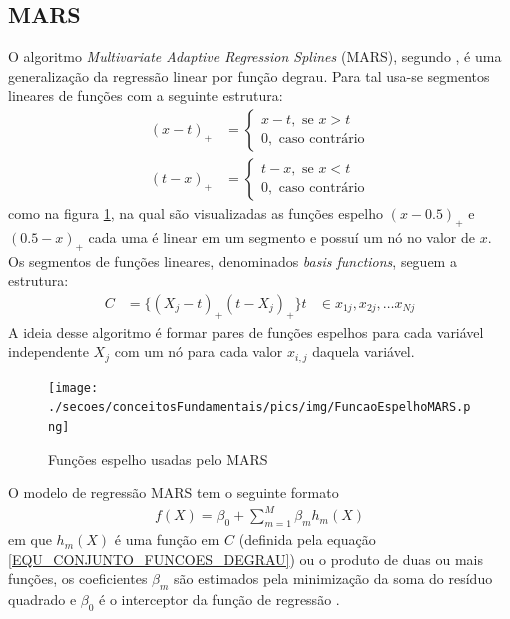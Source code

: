 \subsection{MARS}
O algoritmo \emph{Multivariate Adaptive Regression Splines} (MARS), segundo , é uma generalização da regressão linear por função degrau. Para tal usa-se segmentos lineares de funções com a seguinte estrutura:
\begin{align}
(x-t)_{+} &= \begin{cases}
x-t, \textrm{ se } x > t \\
0,   \textrm{ caso contrário}
\end{cases}
\\
(t-x)_{+} &= \begin{cases}
t-x, \textrm{ se } x < t \\
0, \textrm{ caso contrário}
\end{cases} 
\end{align}
como na figura \ref{FIGURA_MARS_FUNCAO_ESPELHO}, na qual são visualizadas as funções espelho \((x-0.5)_{+}\) e \((0.5-x)_{+}\) cada uma é linear em um segmento e possuí um nó no valor de \(x\). Os segmentos de funções lineares, denominados \emph{basis functions}, seguem a estrutura:
\begin{align}
C &= \{(X_{j}-t)_{+}(t-X_{j})_{+}\} t &\in {x_{1j}, x_{2j}, \ldots x_{Nj}} \label{EQU_CONJUNTO_FUNCOES_DEGRAU}
\end{align}
A ideia desse algoritmo é formar pares de funções espelhos para cada variável independente \(X_{j}\) com um nó para cada valor \(x_{i,j}\) daquela variável.
\begin{figure}[hbt]
	\centering
 	  \caption{Funções espelho usadas pelo MARS}
		\texttt{[image: ./secoes/conceitosFundamentais/pics/img/FuncaoEspelhoMARS.png]}
	\label{FIGURA_MARS_FUNCAO_ESPELHO}
\end{figure}

\noindent
O modelo de regressão MARS tem o seguinte formato
\begin{align}
f(X) = \beta_{0} + \sum\limits_{m=1}^{M}\beta_{m}h_{m}(X)
\end{align}
em que \(h_{m}(X)\) é uma função em \(C\) (definida pela equação \eqref{EQU_CONJUNTO_FUNCOES_DEGRAU}) ou o produto de duas ou mais funções, os coeficientes \(\beta_{m}\) são estimados pela minimização da soma do resíduo quadrado e \(\beta_{0}\) é o interceptor da função de regressão \cite{StatisticalLearning2001}.

